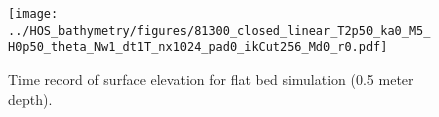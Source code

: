 \begin{figure}[H]%
\centering
\texttt{[image: ../HOS\_bathymetry/figures/81300\_closed\_linear\_T2p50\_ka0\_M5\_H0p50\_theta\_Nw1\_dt1T\_nx1024\_pad0\_ikCut256\_Md0\_r0.pdf]}%
\caption{Time record of surface elevation for flat bed simulation (0.5 meter depth).}%
\label{fig:ts:flat}%
\end{figure}








